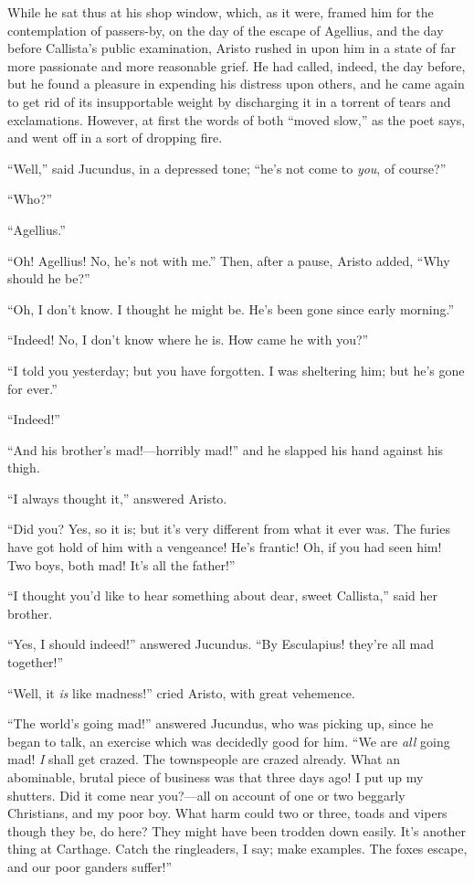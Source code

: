 While he sat thus at his shop window, which, as it were, framed him
for the contemplation of passers-by, on the day of the escape of
Agellius, and the day before Callista's public examination, Aristo
rushed in upon him in a state of far more passionate and more
reasonable grief. He had called, indeed, the day before, but he found
a pleasure in expending his distress upon others, and he came again to
get rid of its insupportable weight by discharging it in a torrent of
tears and exclamations. However, at first the words of both
``moved slow,'' as the poet says, and went off in a sort of
dropping fire.

``Well,'' said Jucundus, in a depressed tone; ``he's
not come to \emph{you}, of course?''

``Who?''

``Agellius.''

``Oh! Agellius! No, he's not with me.'' Then, after a
pause, Aristo added, ``Why should he be?''

``Oh, I don't know. I thought he might be. He's been gone since
early morning.''

``Indeed! No, I don't know where he is. How came he with
you?''

``I told you yesterday; but you have forgotten. I was
sheltering him; but he's gone for ever.''

``Indeed!''

``And his brother's mad!—horribly mad!'' and he slapped
his hand against his thigh.

``I always thought it,'' answered Aristo.

``Did you? Yes, so it is; but it's very different from what it
ever was. The furies have got hold of him with a vengeance! He's
frantic! Oh, if you had seen him! Two boys, both mad! It's all the
father!''

``I thought you'd like to hear something about dear, sweet
Callista,'' said her brother.

``Yes, I should indeed!'' answered Jucundus. ``By
Esculapius! they're all mad together!''

``Well, it \emph{is} like madness!'' cried Aristo, with great
vehemence.

``The world's going mad!'' answered Jucundus, who was
picking up, since he began to talk, an exercise which was decidedly
good for him. ``We are \emph{all} going mad! \emph{I} shall get
crazed. The townspeople are crazed already. What an abominable, brutal
piece of business was that three days ago! I put up my shutters. Did
it come near you?—all on account of one or two beggarly Christians,
and my poor boy. What harm could two or three, toads and vipers though
they be, do here? They might have been trodden down easily. It's
another thing at Carthage. Catch the ringleaders, I say; make
examples. The foxes escape, and our poor ganders suffer!''

